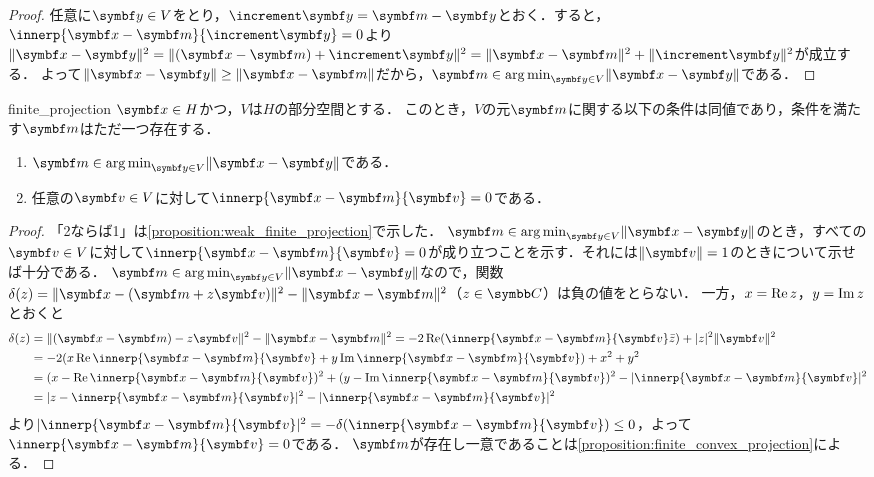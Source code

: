 \documentclass[../../main]{subfiles}
\begin{document}
\begin{proof}
  任意に\(\vect{y}\in V\)をとり，\(\increment\vect{y}=\vect{m}-\vect{y}\)とおく．すると，\(\innerp{\vect{x}-\vect{m}}{\increment\vect{y}}=0\)より
  \(\vnorm{\vect{x}-\vect{y}}^2=\vnorm{(\vect{x}-\vect{m})+\increment\vect{y}}^2=\vnorm{\vect{x}-\vect{m}}^2+\vnorm{\increment\vect{y}}^2\)が成立する．
  よって\(\vnorm{\vect{x}-\vect{y}}\geq\vnorm{\vect{x}-\vect{m}}\)だから，\(\vect{m}\in\argmin_{\vect{y}\in V}\vnorm{\vect{x}-\vect{y}}\)である．
\end{proof}

\begin{proposition}{}{finite_projection}
  \(\vect{x}\in H\)かつ，\(V\)は\(H\)の部分空間とする．
  このとき，\(V\)の元\(\vect{m}\)に関する以下の条件は同値であり，条件を満たす\(\vect{m}\)はただ一つ存在する．
  \begin{enumerate}
    \item \(\vect{m}\in\argmin_{\vect{y}\in V}\vnorm{\vect{x}-\vect{y}}\)である．
    \item 任意の\(\vect{v}\in V\)に対して\(\innerp{\vect{x}-\vect{m}}{\vect{v}}=0\)である．
  \end{enumerate}
\end{proposition}

\begin{proof}
  「2ならば1」は\cref{proposition:weak_finite_projection}で示した．
  \(\vect{m}\in\argmin_{\vect{y}\in V}\vnorm{\vect{x}-\vect{y}}\)のとき，すべての\(\vect{v}\in V\)に対して\(\innerp{\vect{x}-\vect{m}}{\vect{v}}=0\)が成り立つことを示す．それには\(\vnorm{\vect{v}}=1\)のときについて示せば十分である．
  \(\vect{m}\in\argmin_{\vect{y}\in V}\vnorm{\vect{x}-\vect{y}}\)なので，関数\(\delta(z)=\vnorm{\vect{x}-(\vect{m}+z\vect{v})}^2-\vnorm{\vect{x}-\vect{m}}^2\)（\(z\in\numset{C}\)）は負の値をとらない．
  一方，\(x=\operatorname{Re} z\)，\(y=\operatorname{Im} z\)とおくと
  \begin{align*}
    \delta(z) &= \vnorm{(\vect{x}-\vect{m})-z\vect{v}}^2-\vnorm{\vect{x}-\vect{m}}^2
    = -2\rpart(\innerp{\vect{x}-\vect{m}}{\vect{v}}\conj{z})+\abs{z}^2\vnorm{\vect{v}}^2 \\
    &= -2(x\rpart\innerp{\vect{x}-\vect{m}}{\vect{v}}+y\ipart\innerp{\vect{x}-\vect{m}}{\vect{v}})+x^2+y^2 \\
    &= (x-\rpart\innerp{\vect{x}-\vect{m}}{\vect{v}})^2+(y-\ipart\innerp{\vect{x}-\vect{m}}{\vect{v}})^2-\abs{\innerp{\vect{x}-\vect{m}}{\vect{v}}}^2 \\
    &= \abs{z-\innerp{\vect{x}-\vect{m}}{\vect{v}}}^2-\abs{\innerp{\vect{x}-\vect{m}}{\vect{v}}}^2
  \end{align*}
  より\(\abs{\innerp{\vect{x}-\vect{m}}{\vect{v}}}^2=-\delta(\innerp{\vect{x}-\vect{m}}{\vect{v}})\leq 0\)，よって\(\innerp{\vect{x}-\vect{m}}{\vect{v}}=0\)である．
  \(\vect{m}\)が存在し一意であることは\cref{proposition:finite_convex_projection}による．
\end{proof}
\end{document}
